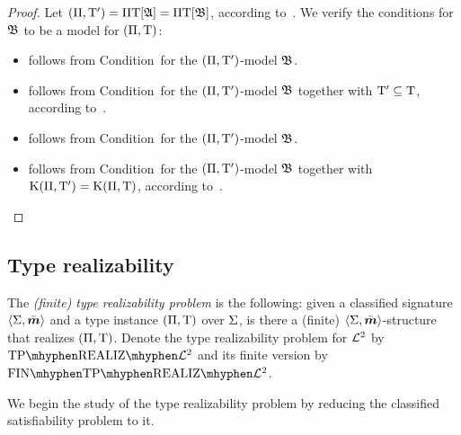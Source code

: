 \begin{proof}
Let $(\Pi,{\mathrm{T}'}) = \Pi\mathrm{T}[\mathfrak{A}] = \Pi\mathrm{T}[\mathfrak{B}]$,
according to~.
We verify the conditions for $\mathfrak{B}$ to be a model for $(\Pi,\mathrm{T})$:
\begin{itemize}
  \item[\refcondrealizI]
  follows from Condition~ for the $(\Pi,{\mathrm{T}'})$-model $\mathfrak{B}$.
  \item[\refcondrealizII]
  follows from Condition~ for the $(\Pi,{\mathrm{T}'})$-model
  $\mathfrak{B}$ together with ${\mathrm{T}'} \subseteq \mathrm{T}$, according
  to~.
  \item[\refcondrealizp]
  follows from Condition~ for the $(\Pi,{\mathrm{T}'})$-model
  $\mathfrak{B}$.
  \item[\refcondrealizk]
  follows from Condition~ for the $(\Pi,{\mathrm{T}'})$-model
  $\mathfrak{B}$ together with $\mathrm{K}(\Pi,{\mathrm{T}'}) = \mathrm{K}(\Pi,\mathrm{T})$, according
  to~.
\end{itemize}
\end{proof}

\subsection{Type realizability}
\begin{definition}
The \emph{(finite) type realizability problem} is the following:
given a classified signature $\left\langle \mathrm{\Sigma},\bar{\bm{m}} \right\rangle$ and a type instance
$(\Pi,\mathrm{T})$ over $\mathrm{\Sigma}$, is there a (finite)
$\left\langle \mathrm{\Sigma},\bar{\bm{m}} \right\rangle$-structure that realizes $(\Pi,\mathrm{T})$.
Denote the type realizability problem for $\mathcal{L}^{2}$ by
$\Real{\vFo2}$ and its finite version by $\FinReal{\vFo2}$.
\end{definition}

We begin the study of the type realizability problem by reducing the
classified satisfiability problem to it.

